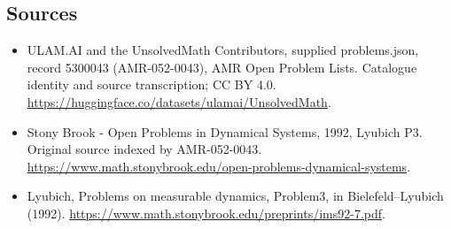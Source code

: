 \documentclass[11pt,a4paper]{article}
\begin{document}
\subsection{Sources}
\begin{itemize}
\item[S1] ULAM.AI and the UnsolvedMath Contributors, supplied problems.json, record 5300043 (AMR-052-0043), AMR Open Problem Lists. Catalogue identity and source transcription; CC BY 4.0.
\url{https://huggingface.co/datasets/ulamai/UnsolvedMath}.
\item[S2] Stony Brook - Open Problems in Dynamical Systems, 1992, Lyubich P3. Original source indexed by AMR-052-0043.
\url{https://www.math.stonybrook.edu/open-problems-dynamical-systems}.
\item[S3] Lyubich, Problems on measurable dynamics, Problem3, in Bielefeld–Lyubich (1992).
\url{https://www.math.stonybrook.edu/preprints/ims92-7.pdf}.
\end{itemize}
\end{document}
